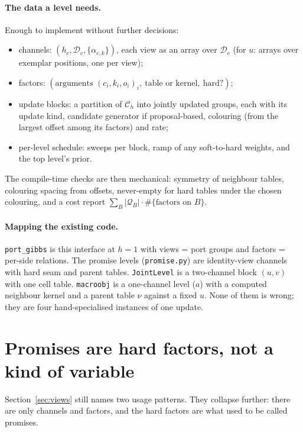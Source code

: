\documentclass[11pt]{article}
\newcommand{\1}{\mathds{1}}
\newcommand{\Dom}{\mathcal{D}}
\newcommand{\Chan}{\mathcal{C}}
\newcommand{\Cand}{\mathcal{Q}}
\begin{document}
\paragraph{The data a level needs.} Enough to implement without further
decisions:
\begin{itemize}
  \item channels: $(h_c, \Dom_c, \{\alpha_{c,k}\})$, each view as an array over
        $\Dom_c$ (for $u$: arrays over exemplar positions, one per view);
  \item factors: $(\text{arguments } (c_i, k_i, o_i)_i,\ \text{table or kernel},\ \text{hard?})$;
  \item update blocks: a partition of $\Chan_h$ into jointly updated groups,
        each with its update kind, candidate generator if proposal-based, colouring
        (from the largest offset among its factors) and rate;
  \item per-level schedule: sweeps per block, ramp of any soft-to-hard weights,
        and the top level's prior.
\end{itemize}
The compile-time checks are then mechanical: symmetry of neighbour tables,
colouring spacing from offsets, never-empty for hard tables under the chosen
colouring, and a cost report $\sum_B |\Cand_B| \cdot \#\{\text{factors on } B\}$.

\paragraph{Mapping the existing code.} \texttt{port\_gibbs} is this interface at
$h = 1$ with views = port groups and factors = per-side relations. The promise
levels (\texttt{promise.py}) are identity-view channels with hard seam and parent
tables. \texttt{JointLevel} is a two-channel block $(u, v)$ with one cell table.
\texttt{macroobj} is a one-channel level ($a$) with a computed neighbour kernel
and a parent table $\nu$ against a fixed $u$. None of them is wrong; they are
four hand-specialised instances of one update.

\section{Promises are hard factors, not a kind of variable}
\label{sec:hard}

Section~\ref{sec:views} still names two usage patterns. They collapse further:
there are only channels and factors, and the hard factors are what used to be
called promises.
\end{document}
